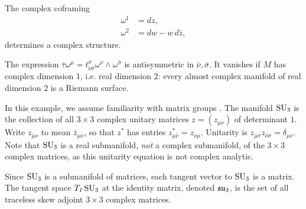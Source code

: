 \begin{example}
The complex coframing
\begin{align*}
\omega^1&=dz,\\
\omega^2&=dw-w\,d\bar{z},
\end{align*}
determines a complex structure.
\end{example}
\begin{example}
The expression \(\bar\tau\omega^{\mu}=t^{\mu}_{\bar\nu\bar\sigma}\omega^{\bar{\nu}}\wedge\omega^{\bar{\sigma}}\) is antisymmetric in \(\bar\nu,\bar\sigma\).
It vanishes if \(M\) has complex dimension \(1\), i.e. real dimension \(2\):
every almost complex manifold of real dimension \(2\) is a Riemann surface.
\end{example}
\begin{example}
In this example, we assume familiarity with matrix groups \cite{Stillwell:2008}.
The manifold \(\operatorname{SU}_{3}\) is the collection of all \(3\times3\) complex unitary matrices \(z=(z_{\mu\bar\nu})\) of determinant \(1\).
Write \(z_{\bar\mu\nu}\) to mean \(\bar{z}_{\mu\bar\nu}\), so that \(z^*\) has entries \(z^*_{\mu\bar\nu}=z_{\bar\nu\mu}\).
Unitarity is \(z_{\mu\bar\sigma}z_{\bar\nu\sigma}=\delta_{\mu\bar\nu}\).
Note that \(\operatorname{SU}_{3}\) is a real submanifold, \emph{not} a complex submanifold, of the \(3\times3\) complex matrices, as this unitarity equation is not complex analytic.

Since \(\operatorname{SU}_{3}\) is a submanifold of matrices, each tangent vector to \(\operatorname{SU}_{3}\) is a matrix.
The tangent space \(T_I \operatorname{SU}_{3}\) at the identity matrix, denoted \(\LieSU_3\), is the set of all traceless skew adjoint \(3\times3\) complex matrices.


\end{example}
